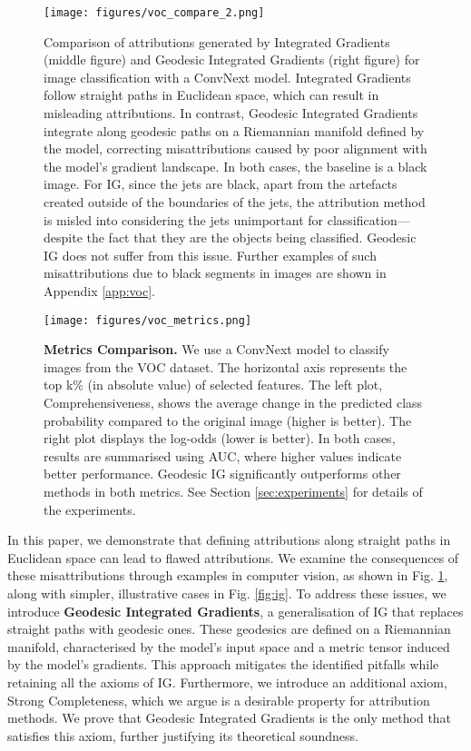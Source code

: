 \begin{figure}[t!]
	\begin{center}
		\centerline{\texttt{[image: figures/voc\_compare\_2.png]}}
		\caption{Comparison of attributions generated by Integrated Gradients (middle figure) and Geodesic Integrated Gradients (right figure) for image classification with a ConvNext model. Integrated Gradients follow straight paths in Euclidean space, which can result in misleading attributions. In contrast, Geodesic Integrated Gradients integrate along geodesic paths on a Riemannian manifold defined by the model, correcting misattributions caused by poor alignment with the model's gradient landscape. In both cases, the baseline is a black image.
		For IG, since the jets are black, apart from the artefacts created outside of the boundaries of the jets, the attribution method is misled into considering the jets unimportant for classification—despite the fact that they are the objects being classified. Geodesic IG does not suffer from this issue. Further examples of such misattributions due to black segments in images are shown in Appendix \ref{app:voc}.}
		\label{fig:duck}
	\end{center}
	\vskip -0.3in
\end{figure}

\begin{figure}[b!]
	\vskip 0.2in
	\begin{center}
		\texttt{[image: figures/voc\_metrics.png]}
		\caption{ \textbf{Metrics Comparison.} We use a ConvNext model to classify images from the VOC dataset. The horizontal axis represents the top k\% (in absolute value) of selected features.
		The left plot, Comprehensiveness, shows the average change in the predicted class probability compared to the original image (higher is better). The right plot displays the log-odds (lower is better).
		In both cases, results are summarised using AUC, where higher values indicate better performance. Geodesic IG significantly outperforms other methods in both metrics. See Section \ref{sec:experiments} for details of the experiments.}
		\label{fig:voc_metrics}
	\end{center}
	\vskip -0.2in
\end{figure}


In this paper, we demonstrate that defining attributions along straight paths in Euclidean space can lead to flawed attributions. We examine the consequences of these misattributions through examples in computer vision, as shown in Fig. \ref{fig:duck}, along with simpler, illustrative cases in Fig. \ref{fig:ig}. To address these issues, we introduce \textbf{Geodesic Integrated Gradients}, a generalisation of IG that replaces straight paths with geodesic ones. These geodesics are defined on a Riemannian manifold, characterised by the model's input space and a metric tensor induced by the model's gradients. This approach mitigates the identified pitfalls while retaining all the axioms of IG. Furthermore, we introduce an additional axiom, Strong Completeness, which we argue is a desirable property for attribution methods. We prove that Geodesic Integrated Gradients is the only method that satisfies this axiom, further justifying its theoretical soundness.

